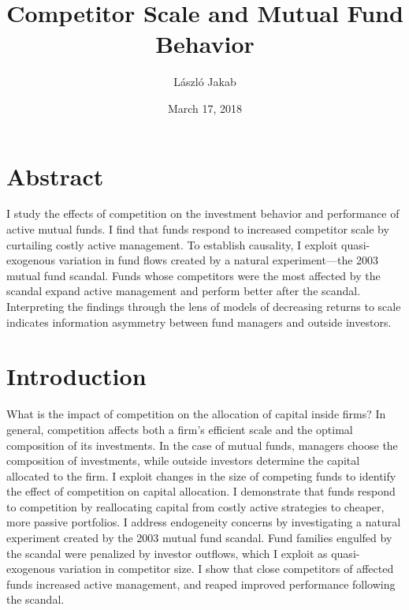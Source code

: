 \documentclass[openany]{book}
\title{Competitor Scale and Mutual Fund Behavior}
\author{László Jakab}
\date{March 17, 2018}
\theoremstyle{definition}
\theoremstyle{definition}
\theoremstyle{definition}
\theoremstyle{remark}
\begin{document}
\maketitle

{
\setcounter{tocdepth}{1}
\tableofcontents
}
\chapter*{Abstract}\label{abstract}

I study the effects of competition on the investment behavior and
performance of active mutual funds. I find that funds respond to
increased competitor scale by curtailing costly active management. To
establish causality, I exploit quasi-exogenous variation in fund flows
created by a natural experiment---the 2003 mutual fund scandal. Funds
whose competitors were the most affected by the scandal expand active
management and perform better after the scandal. Interpreting the
findings through the lens of models of decreasing returns to scale
indicates information asymmetry between fund managers and outside
investors.

\chapter{Introduction}\label{introduction}

What is the impact of competition on the allocation of capital inside
firms? In general, competition affects both a firm's efficient scale and
the optimal composition of its investments. In the case of mutual funds,
managers choose the composition of investments, while outside investors
determine the capital allocated to the firm. I exploit changes in the
size of competing funds to identify the effect of competition on capital
allocation. I demonstrate that funds respond to competition by
reallocating capital from costly active strategies to cheaper, more
passive portfolios. I address endogeneity concerns by investigating a
natural experiment created by the 2003 mutual fund scandal. Fund
families engulfed by the scandal were penalized by investor outflows,
which I exploit as quasi-exogenous variation in competitor size. I show
that close competitors of affected funds increased active management,
and reaped improved performance following the scandal.
\end{document}
